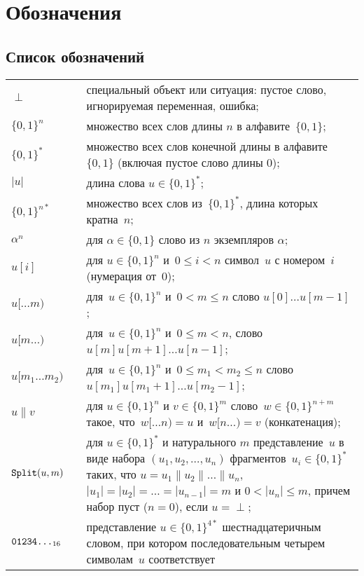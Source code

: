 \chapter{Обозначения}\label{DEFS}

\section{Список обозначений}

{\tabcolsep 0pt
\begin{longtable}{lrp{14.0cm}}
$\perp$  & \hspace{3mm} &
специальный объект или ситуация: 
пустое слово, игнорируемая переменная, ошибка;
\\[4pt]
%
$\{0,1\}^n$  &&
множество всех слов длины $n$ в алфавите~$\{0,1\}$;
\\[4pt]
%
$\{0,1\}^*$  &&
множество всех слов конечной длины в алфавите~$\{0,1\}$
(включая пустое слово длины $0$);
\\[4pt]
%
$|u|$      &&
длина слова $u\in\{0,1\}^*$;
\\[4pt]
%
$\{0,1\}^{n*}$  &&
множество всех слов из~$\{0,1\}^*$,
длина которых кратна~$n$;
\\[4pt]
%
$\alpha^n$  &&
для $\alpha\in\{0,1\}$ слово из $n$ экземпляров $\alpha$;
\\[4pt]
%
$u[i]$ &&
для $u\in\{0,1\}^n$ и~$0\leq i<n$ символ~$u$ с номером~$i$
(нумерация от~$0$);
\\[4pt]
%
$u[\dots m)$ &&
для~$u\in\{0,1\}^n$ и~$0<m\leq n$ слово $u[0]\ldots u[m-1]$;
\\[4pt]
%
$u[m\dots)$  && 
для~$u\in\{0,1\}^n$ и~$0\leq m<n$, слово~$u[m]u[m+1]\ldots u[n-1]$;
\\[4pt]
%
$u[m_1\dots m_2)$  && 
для~$u\in\{0,1\}^n$ и~$0\leq m_1 <m_2\leq n$ слово
$u[m_1]u[m_1+1]\ldots u[m_2-1]$; 
\\[4pt]
%
$u\parallel v$  &&
для $u\in\{0,1\}^n$ и $v\in\{0,1\}^m$
слово~$w\in\{0,1\}^{n+m}$ такое, что~$w[\dots n)=u$ и~$w[n\dots)=v$
(конкатенация);
\\[4pt]
%
$\mathop{\texttt{Split}}\nolimits(u,m)$ &&
для $u\in\{0,1\}^*$ и натурального $m$ представление~$u$
в виде набора $(u_1,u_2,\ldots,u_n)$ фрагментов~$u_i\in\{0,1\}^*$ 
таких, что
$u=u_1\parallel u_2\parallel\ldots\parallel u_n$,
$|u_1|=|u_2|=\ldots=|u_{n-1}|=m$ и $0<|u_n|\leq m$, 
причем набор пуст ($n=0$), если $u=\perp$;
\\[4pt]
%
$\texttt{01234\ldots}_{16}$ && 
представление $u\in\{0,1\}^{4*}$ шестнадцатеричным словом,
при котором последовательным четырем символам~$u$ соответствует

\end{longtable}}

